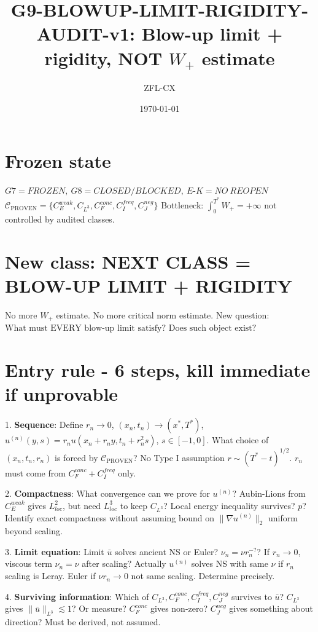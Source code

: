 \documentclass[11pt]{article}
\begin{document}
\title{G9-BLOWUP-LIMIT-RIGIDITY-AUDIT-v1: Blow-up limit + rigidity, NOT $W_+$ estimate}
\author{ZFL-CX}\date{\today}\maketitle

\section{Frozen state}
$\boxed{G7=FROZEN,\ G8=CLOSED/BLOCKED,\ E\text{-}K=NO\ REOPEN}$
$\boxed{\mathcal C_{\mathrm{PROVEN}}=\{C_E^{weak},C_{L^3},C_F^{conc},C_I^{freq},C_J^{neg}\}}$
Bottleneck: $\boxed{\int_0^{T^*}W_+=+\infty}$ not controlled by audited classes.

\section{New class: NEXT CLASS = BLOW-UP LIMIT + RIGIDITY}
No more $W_+$ estimate. No more critical norm estimate. New question:
$\boxed{\text{What must EVERY blow-up limit satisfy? Does such object exist?}}$

\section{Entry rule - 6 steps, kill immediate if unprovable}
1. \textbf{Sequence}: Define $r_n\to0$, $(x_n,t_n)\to(x^*,T^*)$, $u^{(n)}(y,s)=r_n u(x_n+r_ny,t_n+r_n^2s)$, $s\in[-1,0]$. What choice of $(x_n,t_n,r_n)$ is forced by $\mathcal C_{\mathrm{PROVEN}}$? No Type I assumption $r\sim(T^*-t)^{1/2}$. $r_n$ must come from $C_F^{conc}+C_I^{freq}$ only.

2. \textbf{Compactness}: What convergence can we prove for $u^{(n)}$? Aubin-Lions from $C_E^{weak}$ gives $L^2_{loc}$, but need $L^3_{loc}$ to keep $C_{L^3}$? Local energy inequality survives? $p$? Identify exact compactness without assuming bound on $\|\nabla u^{(n)}\|_2$ uniform beyond scaling.

3. \textbf{Limit equation}: Limit $\bar u$ solves ancient NS or Euler? $\nu_n=\nu r_n^{-?}$? If $r_n\to0$, viscous term $\nu_n=\nu$ after scaling? Actually $u^{(n)}$ solves NS with same $\nu$ if $r_n$ scaling is Leray. Euler if $\nu r_n\to0$ not same scaling. Determine precisely.

4. \textbf{Surviving information}: Which of $C_{L^3},C_F^{conc},C_I^{freq},C_J^{neg}$ survives to $\bar u$? $C_{L^3}$ gives $\|\bar u\|_{L^3}\lesssim1$? Or measure? $C_F^{conc}$ gives non-zero? $C_J^{neg}$ gives something about direction? Must be derived, not assumed.
\end{document}
